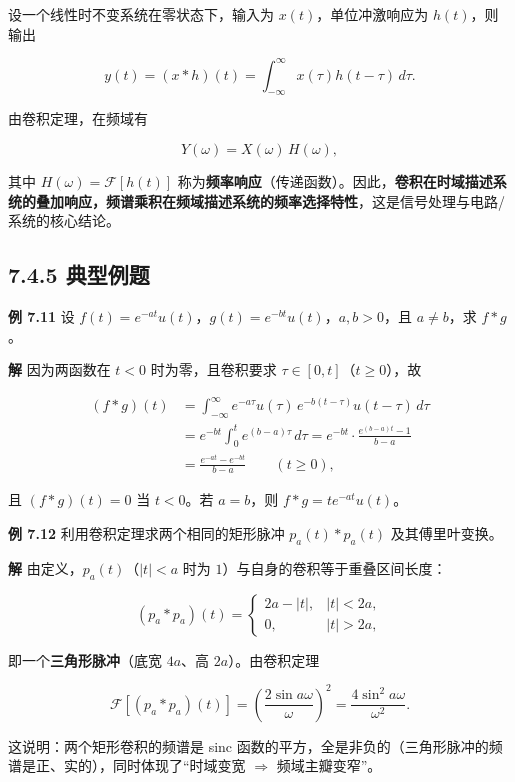 设一个线性时不变系统在零状态下，输入为 \(x(t)\)，单位冲激响应为
\(h(t)\)，则输出

\[
y(t)=(x*h)(t)=\int_{-\infty}^{\infty}x(\tau)h(t-\tau)\,d\tau .
\]

由卷积定理，在频域有

\[
Y(\omega)=X(\omega)\,H(\omega),
\]

其中 \(H(\omega)=\mathcal F[h(t)]\)
称为\textbf{频率响应}（传递函数）。因此，\textbf{卷积在时域描述系统的叠加响应，频谱乘积在频域描述系统的频率选择特性}，这是信号处理与电路/系统的核心结论。

\subsection{7.4.5 典型例题}\label{ux5178ux578bux4f8bux9898-5}

\textbf{例 7.11} 设
\(f(t)=e^{-at}u(t)\)，\(g(t)=e^{-bt}u(t)\)，\(a,b>0\)，且
\(a\neq b\)，求 \(f*g\)。

\textbf{解} 因为两函数在 \(t<0\) 时为零，且卷积要求
\(\tau\in[0,t]\)（\(t\ge0\)），故

\[
\begin{aligned}
(f*g)(t)
&=\int_{-\infty}^{\infty}e^{-a\tau}u(\tau)\,e^{-b(t-\tau)}u(t-\tau)\,d\tau\\
&=e^{-bt}\int_{0}^{t}e^{(b-a)\tau}\,d\tau
=e^{-bt}\cdot\frac{e^{(b-a)t}-1}{b-a}\\
&=\frac{e^{-at}-e^{-bt}}{b-a}\qquad(t\ge0),
\end{aligned}
\]

且 \((f*g)(t)=0\) 当 \(t<0\)。若 \(a=b\)，则 \(f*g=t e^{-at}u(t)\)。

\textbf{例 7.12} 利用卷积定理求两个相同的矩形脉冲 \(p_a(t)*p_a(t)\)
及其傅里叶变换。

\textbf{解} 由定义，\(p_a(t)\)（\(|t|<a\) 时为
\(1\)）与自身的卷积等于重叠区间长度：

\[
(p_a*p_a)(t)=
\begin{cases}
2a-|t|, & |t|<2a,\\
0, & |t|>2a,
\end{cases}
\]

即一个\textbf{三角形脉冲}（底宽 \(4a\)、高 \(2a\)）。由卷积定理

\[
\mathcal F[(p_a*p_a)(t)]=\left(\frac{2\sin a\omega}{\omega}\right)^2
=\frac{4\sin^2 a\omega}{\omega^2}.
\]

这说明：两个矩形卷积的频谱是 sinc
函数的平方，全是非负的（三角形脉冲的频谱是正、实的），同时体现了``时域变宽
\(\Rightarrow\) 频域主瓣变窄''。

